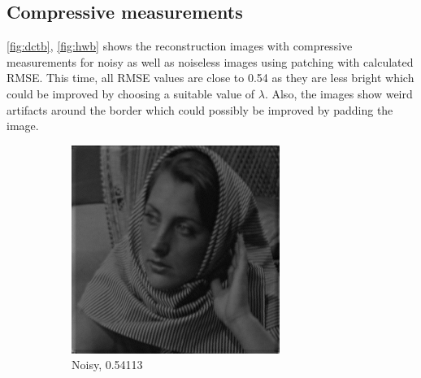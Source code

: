 \documentclass[a4paper]{article}
\begin{document}
\subsection{Compressive measurements}
\ref{fig:dctb}, \ref{fig:hwb} shows the reconstruction images with compressive measurements for noisy as well as noiseless images using patching with calculated RMSE. This time, all RMSE values are close to 0.54 as they are less bright which could be improved by choosing a suitable value of $\lambda$. Also, the images show weird artifacts around the border which could possibly be improved by padding the image.
\begin{figure}[H]
    \centering
    \begin{subfigure}{0.24\linewidth}
        \centering
        \includegraphics[width = \linewidth]{dct2D/barbara256 reconstructed using compressive measurements, with noise.png}
        \caption{Noisy, 0.54113}
    \end{subfigure}
    \begin{subfigure}{0.24\linewidth}
        \centering

\end{subfigure}
\end{figure}
\end{document}

